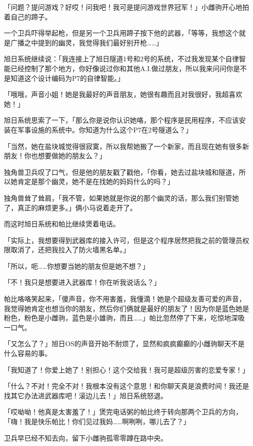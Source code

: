 「问题？提问游戏？好哎！问我吧！我可是提问游戏世界冠军！」小雌驹开心地拍着自己的蹄子。

一个卫兵吓得举起枪，但是另一个卫兵用蹄子按下他的武器，「等等，我想这个就是广播之中提到的幽灵，我觉得我们最好别开枪……」

旭日系统继续说：「我连接上了旭日隧道1号和2号的系统，不过我发现某个自律智能已经控制了那个地方，你好像说过你和其他A.I.做过朋友，所以我来问问你是不是知道这个设计编码为P7的自律智能。」

「哦哦，声音小姐！她是我最好的声音朋友，她很有趣而且对我很好，我超喜欢她！」

旭日系统思索了一下，「那么你是说你认识她咯，那个程序是民用程序，不应该安装在军事设施的系统中。你知道为什么这个P7在2号隧道么？」

「当然，她在盐块城觉得很寂寞，所以我帮她搬了一个新家，而且现在她有很多新朋友！你也想要做她的朋友么？」

独角兽卫兵叹了口气，但是他的朋友戳了戳他，「你看，她去过盐块城和隧道，所以她肯定是那个幽灵，她不是在找她的妈妈什么的吗？」

独角兽耸了耸肩，「我不管，如果她就是你说的那个幽灵的话，那么我们别管她了，真正的麻烦更多。」俩小马说着走开了。

而这时旭日系统和帕比继续煲着电话。

「实际上，我想要得到武器库的接入许可，但是这个程序居然把我之前的管理员权限取消了，还把我拉入了防火墙黑名单。」

「所以，呃……你想要当她的朋友但是她不想？」

「不！我只是想要进入武器库！你在听我说话么？」

帕比咯咯笑起来，「傻声音，你不用害羞，我懂滴！她是个超级友善可爱的声音，我觉得她肯定也想当你的朋友，然后你们俩就是最好的朋友了！因为你是蓝色她是粉色，粉色是小雌驹，蓝色是小雄驹，而且……」帕比忽然停了下来，吃惊地深吸一口气。

「又怎么了？」旭日OS的声音开始不耐烦了，显然和疯疯癫癫的小雌驹聊天不是什么容易的事。

「我知道了！你爱上她了！别担心！这个交给我！我可是超级厉害的恋爱专家！」

「什么？不对！完全不对！我根本没有这个意思！和你聊天真是浪费时间！我还是找其它办法进武器库吧！滚边儿去！」旭日系统怒退。

「哎呦呦！他真是太害羞了！」煲完电话粥的帕比终于转向那两个卫兵的方向，「嗨！我是快乐帕比！你们见过我妈……啊咧咧，哪儿去了？」

卫兵早已经不知去向，留下小雌驹孤零零蹲在路中央。

\horizonline

